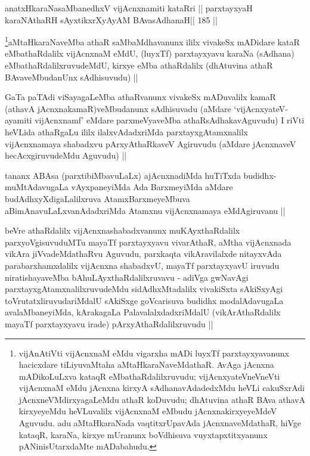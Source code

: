 \begin{shl}
anatxHkaraNasaMbanedhxV vijAcnxnamiti kataRri ||
parxtayxyaH karaNAthaRH sAyxtikxrXyAyAM BAvasAdhanaH\hfill || 185 ||
\end{shl}

\begin{artha}
\footnote{vijAnAtiVti vijAcnxnaM eMdu vigarxha mADi luyxTf 
parxtayxyavanunx hacicxdare tiLiyuvaMtaha aMtaHkaraNaveMdathaR. AvAga 
jAcnxna mADikoLuLxva kataqR eMbathaRdalilxruvudu; vijAcnxyateV\s neVneVti vijAcnxnaM eMdu jAcnxna kirxyA sAdhanavAdadedxMdu heVLi cakuSxrAdi jAcnxneVMdirxyagaLeMdu athaR koDuvudu; dhAtuvina athaR BAva athavA kirxyeyeMdu heVLuvalilx vijAcnxnaM eMbudu jAcnxnakirxyeyeMdeV Aguvudu. adu aMtaHkaraNada vaqtitxrUpavAda jAcnxnaveMdathaR, hiVge kataqR, karaNa, kirxye mUranunx boVdhisuva vuyxtapxtitxyanunx pANinisUtarxdaMte mADabahudu.}aMtaHkaraNaveMba athaR saMbaMdhavanunx ililx vivakeSx mADidare kataR eMbathaRdalilx vijAcnxnaM eMdU, (luyxTf) parxtayxyavu karaNa (sAdhana) eMbathaRdalilxruvudeMdU, kirxye eMba athaRdalilx (dhAtuvina athaR BAvaveMbudanUnx sAdhisuvudu) ||
\end{artha}

\begin{artha}
GaTa paTAdi viSayagaLeMba athaRvanunx vivakeSx mADuvalilx kamaR (athavA 
jAcnxnakamaR)veMbudanunx sAdhisuvadu (aMdare `vijAcnxyateV-ayamiti vijAcnxnamf' eMdare parxmeVyaveMba athaRsAdhakavAguvudu) I riVti heVLida athaRgaLu ililx ilalxvAdadxriMda parxtayxgAtamxnalilx vijAcnxnamaya shabadxvu pArxyAthaRkaveV Agiruvudu (aMdare jAcnxnaveV hecAcxgiruvudeMdu Aguvudu) ||\\
\end{artha}


\begin{artha}
tananx ABAsa (parxtibiMbavuLaLx) ajAcnxnadiMda huTiTxda budidhx-muMtAdavugaLa vAyxpaneyiMda Ada BarxmeyiMda aMdare budAdhxyXdigaLalilxruva AtamxBarxmeyeMbuva aBimAnavuLaLxvanAdadxriMda Atamxnu vijAcnxnamaya eMdAgiruvanu ||
\end{artha}


\begin{artha}
beVre athaRdalilx vijAcnxnashabadxvanunx muKAyxthaRdalilx 
parxyoVgisuvuduMTu mayaTf parxtayxyavu vivarAthaR, aMtha vijAcnxnada 
vikAra jiVvadeMdathaRvu Aguvudu, parxkaqta vikAravilalxde nitayxvAda parabarxhamxdalilx vijAcnxna shabadxvU, mayaTf parxtayxyavU iruvudu niratishayaveMba bAhuLAyxthaRdalilxruvavu - adiVga gwNavAgi parxtayxgAtamxnalilxruvudeMdu sidAdhxMtadalilx vivakiSxta sAkiSxyAgi toVrutatxliruvudariMdalU sAkiSxge goVcarisuva budidhx modalAdavugaLa avalaMbaneyiMda, kArakagaLa PalavalalxdadxriMdalU (vikArAthaRdalilx mayaTf parxtayxyavu irade) pArxyAthaRdalilxruvudu ||
\end{artha}

